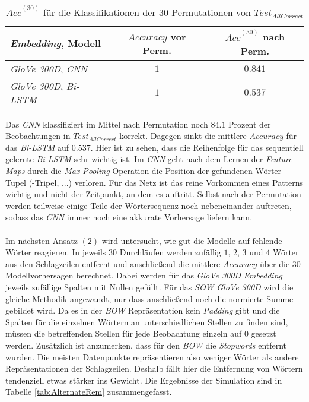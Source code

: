 \documentclass[a4paper,11pt]{article}
\begin{document}
\begin{table}[ht]
\centering
\begin{tabular}{|l|c|c|}
  \hline
  \textit{Embedding}, Modell & $Accuracy$ vor Perm. & $\overline{Acc}^{(30)}$ nach Perm.\\
  \hline
  \textit{GloVe 300D}, \textit{CNN} & $1$ &  $0.841$ \\
  \textit{GloVe 300D}, \textit{Bi-LSTM} & $1$ & $0.537$ \\
  \hline
\end{tabular}
\caption{$\overline{Acc}^{(30)}$ für die Klassifikationen der $30$ Permutationen von $Test_{AllCorrect}$}
\label{tab:AlternatePerm}

\end{table}

Das \textit{CNN} klassifiziert im Mittel nach Permutation noch $84.1$ Prozent der Beobachtungen in $Test_{AllCorrect}$ korrekt. Dagegen sinkt die mittlere $Accuracy$ für das \textit{Bi-LSTM} auf $0.537$. Hier ist zu sehen, dass die Reihenfolge für das sequentiell gelernte \textit{Bi-LSTM} sehr wichtig ist. Im \textit{CNN} geht nach dem Lernen der \textit{Feature Maps} durch die \textit{Max-Pooling} Operation die Position der gefundenen Wörter-Tupel (-Tripel, ...) verloren. Für das Netz ist das reine Vorkommen eines Patterns wichtig und nicht der Zeitpunkt, an dem es auftritt. Selbst nach der Permutation werden teilweise einige Teile der Wörtersequenz noch nebeneinander auftreten, sodass das \textit{CNN} immer noch eine akkurate Vorhersage liefern kann.\\
\\
Im nächsten Ansatz $(2)$ wird untersucht, wie gut die Modelle auf fehlende Wörter reagieren. In jeweils $30$ Durchläufen werden zufällig $1$, $2$, $3$ und $4$ Wörter aus den Schlagzeilen entfernt und anschließend die mittlere $Accuracy$ über die $30$ Modellvorhersagen berechnet. Dabei werden für das \textit{GloVe 300D} \textit{Embedding} jeweils zufällige Spalten mit Nullen gefüllt. Für das \textit{SOW GloVe 300D} wird die gleiche Methodik angewandt, nur dass anschließend noch die normierte Summe gebildet wird. Da es in der \textit{BOW} Repräsentation kein \textit{Padding} gibt und die Spalten für die einzelnen Wörtern an unterschiedlichen Stellen zu finden sind, müssen die betreffenden Stellen für jede Beobachtung einzeln auf $0$ gesetzt werden. Zusätzlich ist anzumerken, dass für den \textit{BOW} die \textit{Stopwords} entfernt wurden. Die meisten Datenpunkte repräsentieren also weniger Wörter als andere Repräsentationen der Schlagzeilen. Deshalb fällt hier die Entfernung von Wörtern tendenziell etwas stärker ins Gewicht. Die Ergebnisse der Simulation sind in Tabelle \ref{tab:AlternateRem} zusammengefasst.
\end{document}
